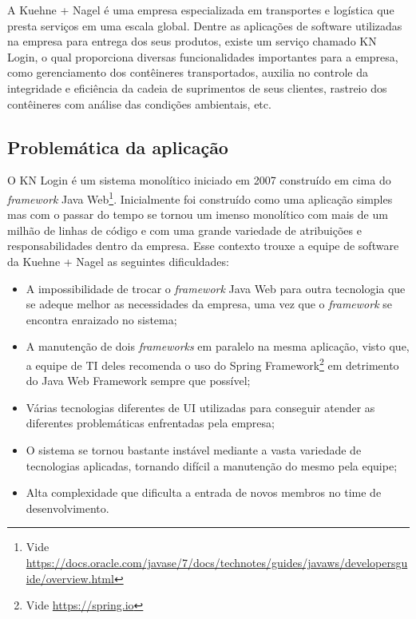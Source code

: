 A Kuehne + Nagel é uma empresa especializada em transportes e logística que presta serviços em uma
escala global. Dentre as aplicações de software utilizadas na empresa para entrega dos seus
produtos, existe um serviço chamado KN Login, o qual proporciona diversas funcionalidades
importantes para a empresa, como gerenciamento dos contêineres transportados, auxilia no controle da
integridade e eficiência da cadeia de suprimentos de seus clientes, rastreio dos contêineres com
análise das condições ambientais, etc.

\subsection{Problemática da aplicação}

O KN Login é um sistema monolítico iniciado em 2007 construído em cima do \textit{framework}
Java Web\footnote{Vide \url{https://docs.oracle.com/javase/7/docs/technotes/guides/javaws/developersguide/overview.html}}.
Inicialmente foi construído como uma aplicação simples mas com o passar do tempo se tornou um imenso
monolítico com mais de um milhão de linhas de código e com uma grande variedade de atribuições e
responsabilidades dentro da empresa. Esse contexto trouxe a equipe de software da Kuehne + Nagel as
seguintes dificuldades:

\begin{itemize}
    \item A impossibilidade de trocar o \textit{framework} Java Web para outra tecnologia que se
        adeque melhor as necessidades da empresa, uma vez que o \textit{framework} se encontra enraizado no sistema;
    \item A manutenção de dois \textit{frameworks} em paralelo na mesma aplicação, visto que, a
    equipe de \gls{TI} deles recomenda o uso do Spring Framework\footnote{Vide \url{https://spring.io}} em
    detrimento do Java Web Framework sempre que possível;
    \item Várias tecnologias diferentes de \gls{UI} utilizadas para conseguir atender as diferentes
    problemáticas enfrentadas pela empresa;
    \item O sistema se tornou bastante instável mediante a vasta variedade de tecnologias aplicadas,
    tornando difícil a manutenção do mesmo pela equipe;
    \item Alta complexidade que dificulta a entrada de novos membros no time de desenvolvimento.
\end{itemize}

